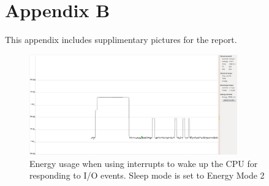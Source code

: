 \section{Appendix B}
\label{appendix:b}

This appendix includes supplimentary pictures for the report.

\begin{figure}[ht!]
    \begin{center}
    \includegraphics[width=0.8\textwidth]{assets/img/interrupt_deep_sleep.png}
    \caption{Energy usage when using interrupts to wake up the CPU for responding to I/O events. Sleep mode is set to Energy Mode 2}
    \label{fig:interrupt_io_deep_sleep}
    \end{center}
\end{figure}
